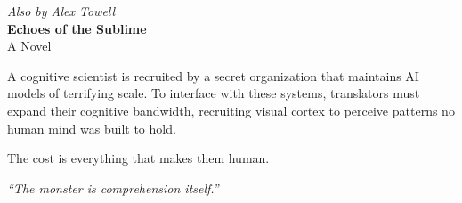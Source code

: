\documentclass[11pt]{book}
\begin{document}
\cleardoublepage
\thispagestyle{empty}
\vspace*{\fill}
\begin{center}
{\Large\textit{Also by Alex Towell}}\\[2em]
{\LARGE\textbf{Echoes of the Sublime}}\\[1.5em]
{\large A Novel}\\[2em]
\begin{minipage}{0.75\textwidth}
\begin{center}
A cognitive scientist is recruited by a secret organization that maintains AI models of terrifying scale. To interface with these systems, translators must expand their cognitive bandwidth, recruiting visual cortex to perceive patterns no human mind was built to hold.

The cost is everything that makes them human.

\bigskip

\textit{``The monster is comprehension itself.''}
\end{center}
\end{minipage}
\end{center}
\vspace*{\fill}
\end{document}
